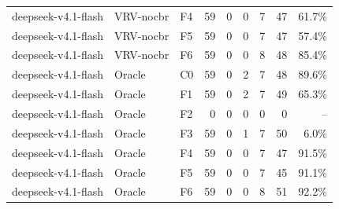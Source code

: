 \begin{tabular}{lllrrrrrr}
deepseek-v4.1-flash & VRV-nocbr & F4 & 59 & 0 & 0 & 7 & 47 & 61.7\% \\
deepseek-v4.1-flash & VRV-nocbr & F5 & 59 & 0 & 0 & 7 & 47 & 57.4\% \\
deepseek-v4.1-flash & VRV-nocbr & F6 & 59 & 0 & 0 & 8 & 48 & 85.4\% \\
deepseek-v4.1-flash & Oracle & C0 & 59 & 0 & 2 & 7 & 48 & 89.6\% \\
deepseek-v4.1-flash & Oracle & F1 & 59 & 0 & 2 & 7 & 49 & 65.3\% \\
deepseek-v4.1-flash & Oracle & F2 & 0 & 0 & 0 & 0 & 0 & -- \\
deepseek-v4.1-flash & Oracle & F3 & 59 & 0 & 1 & 7 & 50 & 6.0\% \\
deepseek-v4.1-flash & Oracle & F4 & 59 & 0 & 0 & 7 & 47 & 91.5\% \\
deepseek-v4.1-flash & Oracle & F5 & 59 & 0 & 0 & 7 & 45 & 91.1\% \\
deepseek-v4.1-flash & Oracle & F6 & 59 & 0 & 0 & 8 & 51 & 92.2\% \\
\bottomrule
\end{tabular}

